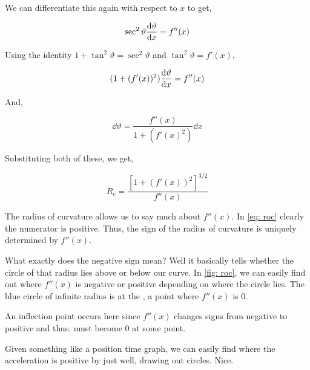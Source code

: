 We can differentiate this again with respect to \(x\) to get,

\begin{equation*}
    \sec^2\vartheta \dv{\vartheta}{x} = f''(x)
\end{equation*}


Using the identity \(1 + \tan^2\vartheta = \sec^2 \vartheta\) and \(\tan^2 \vartheta = f'(x)\),

\begin{equation*}
    (1 + (f'(x))^2) \dv{\vartheta}{x} = f''(x)
\end{equation*}

And, 

\begin{equation*}
    \dd{\vartheta} = \frac{f''(x)}{1 + (f'(x)^2)} \dd{x}
\end{equation*}

Substituting both of these, we get, 

\begin{equation}
    \label{eq: roc}
    \boxed{R_c = \frac{[1 + (f'(x))^2]^{3/2}}{f''(x)}}
\end{equation}


The radius of curvature allows us to say much about \(f''(x)\). In \eqref{eq: roc} 
clearly the numerator is positive. Thus, the sign of the radius of curvature is uniquely determined 
by \(f''(x)\). 

What exactly does the negative sign mean? Well it basically tells whether the circle of 
that radius lies above or below our curve. In \cref{fig: roc}, we 
can easily find out where \(f''(x)\) is negative or 
positive depending on where the circle lies. The blue circle of infinite radius 
is at the , a point where \(f''(x)\) is \(0\). 

An inflection point occurs here since \(f''(x)\) changes signs from negative to positive
and thus, must become \(0\) at some point.

Given something like a position time graph, 
we can easily find where the acceleration is positive by just well, drawing out circles.
Nice.

